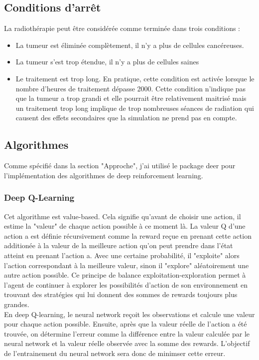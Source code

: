 \documentclass[12pt]{article}
\begin{document}
\subsection{Conditions d'arrêt}
La radiothérapie peut être considérée comme terminée dans trois conditions :
\begin{itemize}
\item La tumeur est éliminée complètement, il n'y a plus de cellules cancéreuses.
\item La tumeur s'est trop étendue, il n'y a plus de cellules saines
\item Le traitement est trop long. En pratique, cette condition est activée lorsque le nombre d'heures de traitement dépasse 2000. Cette condition n'indique pas que la tumeur a trop grandi et elle pourrait être relativement maitrisé mais un traitement trop long implique de trop nombreuses séances de radiation qui causent des effets secondaires que la simulation ne prend pas en compte. 
\end{itemize}
\subsection{Algorithmes}
Comme spécifié dans la section "Approche", j'ai utilisé le package deer \citep{deer} pour l'implémentation des algorithmes de deep reinforcement learning.
\subsubsection{Deep Q-Learning}
Cet algorithme est value-based. Cela signifie qu'avant de choisir une action, il estime la "valeur" de chaque action possible à ce moment là. La valeur Q d'une action a est définie récursivement comme la reward reçue en prenant cette action additionée à la valeur de la meilleure action qu'on peut prendre dans l'état atteint en prenant l'action a. Avec une certaine probabilité, il "exploite" alors l'action correspondant à la meilleure valeur, sinon il "explore" aléatoirement une autre action possible. Ce principe de balance exploitation-exploration permet à l'agent de continuer à explorer les possibilités d'action de son environnement en trouvant des stratégies qui lui donnent des sommes de rewards toujours plus grandes.\\

En deep Q-learning, le neural network reçoit les observations et calcule une valeur pour chaque action possible. Ensuite, après que la valeur réelle de l'action a été trouvée, on détermine l'erreur comme la différence entre la valeur calculée par le neural network et la valeur réelle observée avec la somme des rewards. L'objectif de l'entrainement du neural network sera donc de minimser cette erreur.\\
\end{document}
